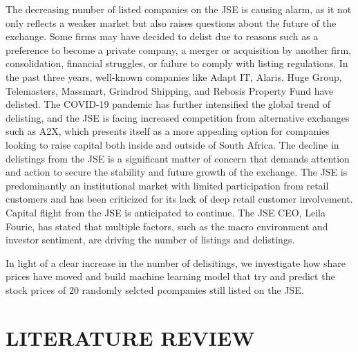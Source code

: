 \documentclass[
]{article}
\begin{document}
The decreasing number of listed companies on the JSE is causing alarm,
as it not only reflects a weaker market but also raises questions about
the future of the exchange. Some firms may have decided to delist due to
reasons such as a preference to become a private company, a merger or
acquisition by another firm, consolidation, financial struggles, or
failure to comply with listing regulations. In the past three years,
well-known companies like Adapt IT, Alaris, Huge Group, Telemasters,
Massmart, Grindrod Shipping, and Rebosis Property Fund have delisted.
The COVID-19 pandemic has further intensified the global trend of
delisting, and the JSE is facing increased competition from alternative
exchanges such as A2X, which presents itself as a more appealing option
for companies looking to raise capital both inside and outside of South
Africa. The decline in delistings from the JSE is a significant matter
of concern that demands attention and action to secure the stability and
future growth of the exchange. The JSE is predominantly an institutional
market with limited participation from retail customers and has been
criticized for its lack of deep retail customer involvement. Capital
flight from the JSE is anticipated to continue. The JSE CEO, Leila
Fourie, has stated that multiple factors, such as the macro environment
and investor sentiment, are driving the number of listings and
delistings.

In light of a clear increase in the number of delisitings, we
investigate how share prices have moved and build machine learning model
that try and predict the stock prices of 20 randomly selcted pcompanies
still listed on the JSE.

\hypertarget{literature-review}{%
\section{LITERATURE REVIEW}\label{literature-review}}
\end{document}
